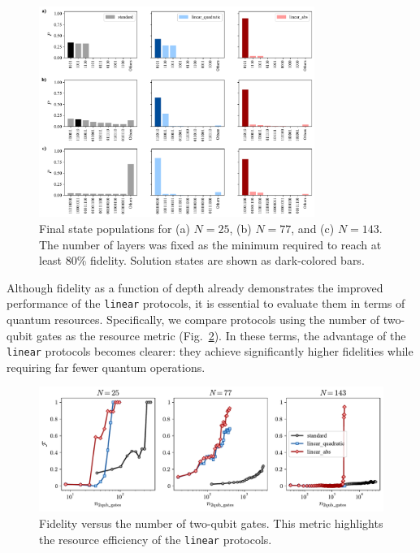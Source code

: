 \begin{figure}[h]
    \centering
    \includegraphics[width=0.8\textwidth]{04-results/figs/populations_2577143.pdf}
    \caption{Final state populations for (a) $N=25$, (b) $N=77$, and (c) $N=143$. The number of layers was fixed as the minimum required to reach at least 80\% fidelity. Solution states are shown as dark-colored bars.}
    \label{fig:populations}
\end{figure}

Although fidelity as a function of depth already demonstrates the improved performance of the \texttt{linear} protocols, it is essential to evaluate them in terms of quantum resources. Specifically, we compare protocols using the number of two-qubit gates as the resource metric (Fig.~\ref{fig:fidelity_gates}). In these terms, the advantage of the \texttt{linear} protocols becomes clearer: they achieve significantly higher fidelities while requiring far fewer quantum operations.  

\begin{figure}[h]
    \centering
    \includegraphics[width=1\textwidth]{04-results/figs/fidelity_gates_2577143.pdf}
    \caption{Fidelity versus the number of two-qubit gates. This metric highlights the resource efficiency of the \texttt{linear} protocols.}
    \label{fig:fidelity_gates}
\end{figure}

